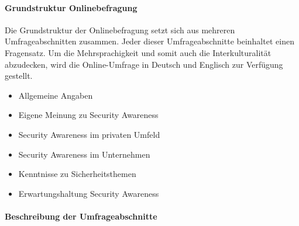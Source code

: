 \documentclass[../../main.tex]{subfiles}
\begin{document}
\paragraph*{Grundstruktur Onlinebefragung}\mbox{}

\begin{sloppypar}
Die Grundstruktur der Onlinebefragung setzt sich aus mehreren Umfrageabschnitten zusammen. Jeder dieser Umfrageabschnitte beinhaltet einen Fragensatz. Um die Mehrsprachigkeit und somit auch die Interkulturalität abzudecken, wird die Online-Umfrage in Deutsch und Englisch zur Verfügung gestellt. 

\begin{itemize}
  \item Allgemeine Angaben
  \item Eigene Meinung zu Security Awareness
  \item Security Awareness im privaten Umfeld
  \item Security Awareness im Unternehmen
  \item Kenntnisse zu Sicherheitsthemen
  \item Erwartungshaltung Security Awareness
\end{itemize}

\end{sloppypar}


\paragraph*{Beschreibung der Umfrageabschnitte}\mbox{}


\sloppy 
\end{document}
